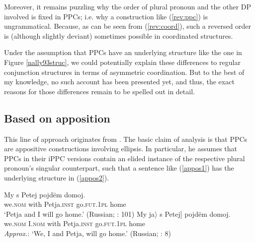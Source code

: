 \documentclass[output=paper,colorlinks,citecolor=brown]{langscibook}
\begin{document}
\noindent Moreover, it remains puzzling why the order of plural pronoun and the other DP involved is fixed in PPCs; i.e. why a construction like (\ref{rev:ppc}) is ungrammatical. Because, as can be seen from (\ref{rev:coord}), such a reversed order is (although slightly deviant) sometimes possible in coordinated structures. 

\ea {}
\z
\z

\noindent Under the assumption that PPCs have an underlying structure like the one in Figure \ref{nally93struc}, we could potentially explain these differences to regular conjunction structures in terms of asymmetric coordination. But to the best of my knowledge, no such account has been presented yet, and thus, the exact reasons for those differences remain to be spelled out in detail. 


\subsection{Based on apposition}\label{sec:app}
This line of approach originates from \citet{Cable2017}. The basic claim of  analysis is that PPCs are appositive constructions involving ellipsis. In particular, he assumes that PPCs in their iPPC versions contain an elided instance of the respective plural pronoun's singular counterpart, such that a sentence like (\ref{appos1}) has the underlying structure in (\ref{appos2}).

\ea \ea
\gll My s Petej pojdëm domoj. \\
 we.\textsc{nom} with Petja.\textsc{inst} go.\textsc{fut.1pl} home \\
 \glt `Petja and I will go home.' \hfill (Russian; \cite{VassilievaLarson2005}: 101) \label{appos1}
\ex
\gll My \minsp{[$\langle$} ja$\rangle$ s Petej] pojdëm domoj. \\
 we.\textsc{nom} {} I.\textsc{nom} with Petja.\textsc{inst} go.\textsc{fut.1pl} home \\
 \glt \textit{Approx.}: `We, I and Petja, will go home.' \hfill (Russian; \cite{Cable2017}: 8) \label{appos2}
\z \z
\end{document}
